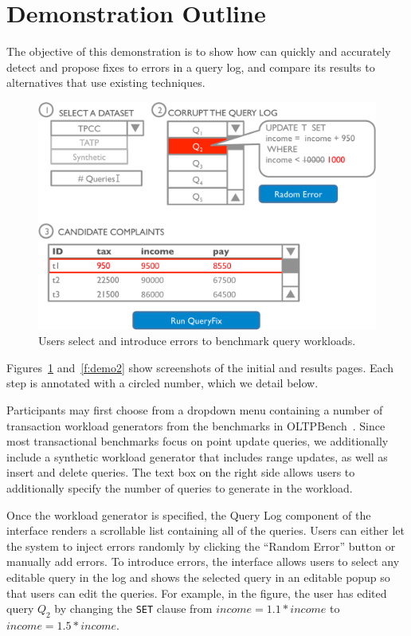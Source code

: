 \section{Demonstration Outline}
\label{sec:demo}

The objective of this demonstration is to show how \sys can quickly and accurately detect 
and propose fixes to errors in a query log, and compare its results to alternatives
that use existing techniques.


\begin{figure}[h]
\centering
  \includegraphics[width = .75\columnwidth]{figures/demo1_exp2}
  \caption{Users select and introduce errors to benchmark query workloads.}
  \label{f:demo1} 
\end{figure}

Figures~\ref{f:demo1} and~\ref{f:demo2} show screenshots of the initial and results pages.
Each step is annotated with a circled number, which we detail below.

 Participants may first choose from a dropdown menu containing
a number of transaction workload generators from the benchmarks in OLTPBench~\cite{oltpbench}.
Since most transactional benchmarks focus on point update queries, we additionally include a 
synthetic workload generator that includes range updates, as well as insert and delete queries.
The text box on the right side allows users to additionally specify the number of queries to generate
in the workload.  

Once the workload generator is specified, the Query Log component of the interface
renders a scrollable list containing all of the queries.  Users can either let the system to 
inject errors randomly by clicking the ``Random Error'' button or manually add errors. 
To introduce errors, the interface allows users to select any editable query in the log and shows the 
selected query in an editable popup so that users can edit the queries.  
For example, in the figure, the user has edited query $Q_2$ by changing the \texttt{SET}
clause from $income = 1.1 * income$ to $income = 1.5 * income$. 

